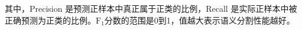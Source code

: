 \par 其中，Precision 是预测正样本中真正属于正类的比例，Recall 是实际正样本中被正确预测为正类的比例。$\text{F}_\text{1}$分数的范围是0到1，值越大表示语义分割性能越好。










